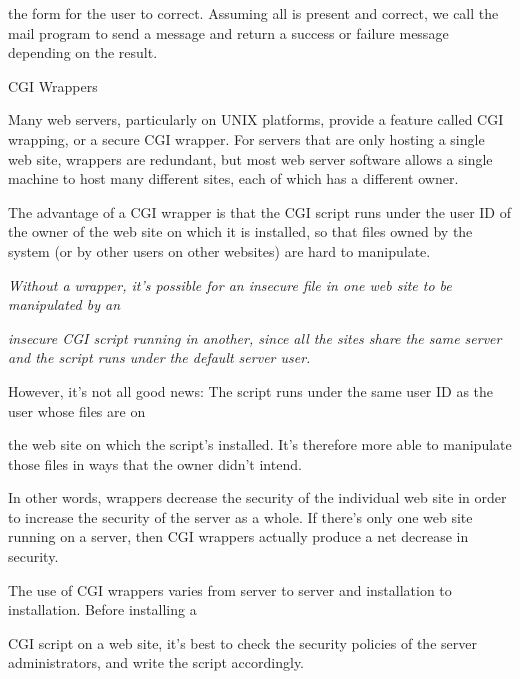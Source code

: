 \documentclass[a4paper,11pt]{book}
\begin{document}
\noindent the form for the user to correct. Assuming all is present and correct, we call the mail program to send a message and return a success or failure message depending on the result.

\noindent 

\noindent CGI Wrappers

\noindent 

\noindent Many web servers, particularly on UNIX platforms, provide a feature called CGI wrapping, or a secure CGI wrapper. For servers that are only hosting a single web site, wrappers are redundant, but most web server software allows a single machine to host many different sites, each of which has a different owner.

\noindent 

\noindent The advantage of a CGI wrapper is that the CGI script runs under the user ID of the owner of the web site on which it is installed, so that files owned by the system (or by other users on other websites) are hard to manipulate.

\noindent 

\noindent \textit{Without a wrapper, it's possible for an insecure file in one web site to be manipulated by an}

\noindent \textit{insecure CGI script running in another, since all the sites share the same server and the script runs under the default server user.}

\noindent 

\noindent However, it's not all good news: The script runs under the same user ID as the user whose files are on

\noindent the web site on which the script's installed. It's therefore more able to manipulate those files in ways that the owner didn't intend.

\noindent 

\noindent In other words, wrappers decrease the security of the individual web site in order to increase the security of the server as a whole. If there's only one web site running on a server, then CGI wrappers actually produce a net decrease in security.

\noindent 

\noindent The use of CGI wrappers varies from server to server and installation to installation. Before installing a

\noindent CGI script on a web site, it's best to check the security policies of the server administrators, and write the script accordingly.
\end{document}

